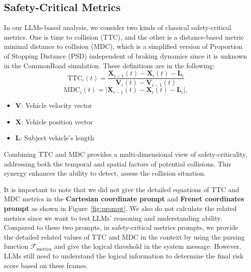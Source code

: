 \subsection{Safety-Critical Metrics}
In our LLMs-based analysis, we consider two kinds of classical safety-critical metrics. One is time to collision (TTC)\cite{vogel2003comparison}, and the other is a distance-based metric minimal distance to collision (MDC), which is a simplified version of Proportion of Stopping Distance (PSD) \cite{astarita2012new} independent of braking dynamics since it is unknown in the CommonRoad simulation. These definitions are in the following:
\[
\text{TTC}_i(t) = \frac{\mathbf{X}_{i-1}(t) - \mathbf{X}_i(t) - \mathbf{L}_i}{\mathbf{V}_i(t) - \mathbf{V}_{i-1}(t)}
\]
\[
\text{MDC}_i(t) = |\mathbf{X}_{i-1}(t) - \mathbf{X}_i(t) - \mathbf{L}_i|,
\]

\begin{itemize}
    \item \(\mathbf{V}\): Vehicle velocity vector
    \item \(\mathbf{X}\): Vehicle position vector
    \item \(\mathbf{L}\): Subject vehicle's length 
\end{itemize}
Combining TTC and MDC provides a multi-dimensional view of safety-criticality, addressing both the temporal and spatial factors of potential collisions. This synergy enhances the ability to detect, assess the collision situation.

It is important to note that we did not give the detailed equations of TTC and MDC metrics in the \textbf{Cartesian coordinate prompt} and \textbf{Frenet coordinates prompt}  as shown in Figure~\ref{fig:prompt}. We also do not calculate the related metrics since we want to test LLMs' reasoning and understanding ability. Compared to these two prompts, in safety-critical metrics prompts, we provide the detailed related values of TTC and MDC in the context by using the parsing function $\mathcal{F}_{\text{metrics}}$ and give the logical threshold in the system message. However, LLMs still need to understand the logical information to determine the final risk score based on these frames.




 